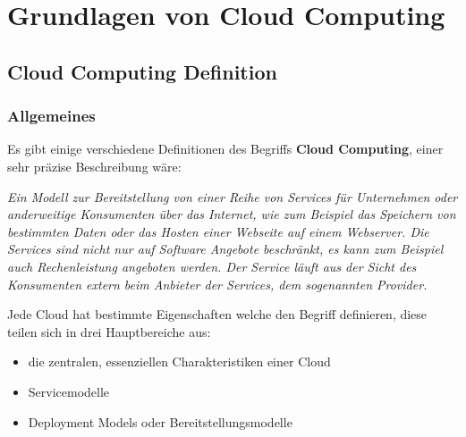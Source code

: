 \chapter{Grundlagen von Cloud Computing}
\putz


\section{Cloud Computing Definition}
\subsection{Allgemeines}
Es gibt einige verschiedene Definitionen des Begriffs \textbf{Cloud Computing}, einer sehr präzise Beschreibung wäre:

\begin{center}
   \textit{Ein Modell zur Bereitstellung von einer Reihe von Services für Unternehmen oder anderweitige Konsumenten über das Internet, wie zum Beispiel das
	Speichern von bestimmten Daten oder das Hosten einer Webseite auf einem Webserver. Die Services sind nicht nur auf Software Angebote beschränkt, es kann zum Beispiel auch Rechenleistung
	angeboten werden. Der Service läuft aus der Sicht des Konsumenten extern beim Anbieter der Services, dem sogenannten Provider.}
\end{center}

Jede Cloud hat bestimmte Eigenschaften welche den Begriff definieren, diese teilen sich in drei Hauptbereiche aus:
\begin{itemize}
	\item die zentralen, essenziellen Charakteristiken einer Cloud
	\item Servicemodelle
	\item Deployment Models oder Bereitstellungsmodelle
\end{itemize}


